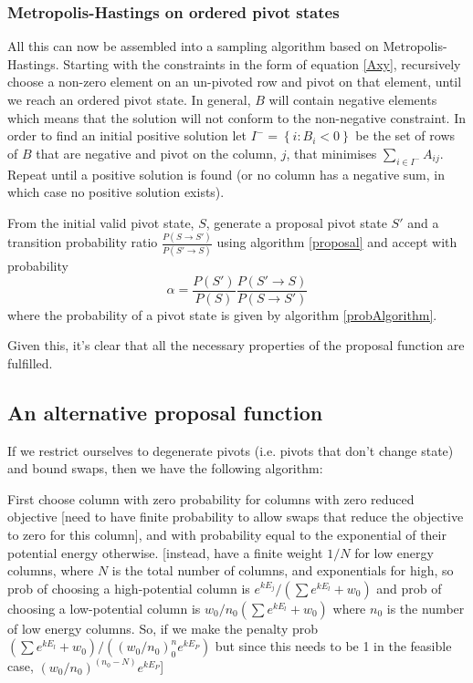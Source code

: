 \documentclass{article}
\begin{document}
\subsubsection{Metropolis-Hastings on ordered pivot states}

All this can now be assembled into a sampling algorithm based on Metropolis-Hastings. Starting with the constraints in the form of equation \ref{Axy}, recursively choose a non-zero element on an un-pivoted row and pivot on that element, until we reach an ordered pivot state. In general, $B$ will contain negative elements which means that the solution will not conform to the non-negative constraint. In order to find an initial positive solution let $I^- = \left\{i: B_i < 0\right\}$ be the set of rows of $B$ that are negative and pivot on the column, $j$, that minimises $\sum_{i\in I^-}A_{ij}$. Repeat until a positive solution is found (or no column has a negative sum, in which case no positive solution exists).

From the initial valid pivot state, $S$, generate a proposal pivot state $S'$ and a transition probability ratio $\frac{P(S\rightarrow S')}{P(S' \rightarrow S)}$ using algorithm \ref{proposal} and accept with probability
\[
\alpha = \frac{P(S')}{P(S)}\frac{P(S'\rightarrow S)}{P(S \rightarrow S')}
\]
where the probability of a pivot state is given by algorithm \ref{probAlgorithm}.

Given this, it's clear that all the necessary properties of the proposal function are fulfilled.

\subsection{An alternative proposal function}

If we restrict ourselves to degenerate pivots (i.e. pivots that don't change state) and bound swaps, then we have the following algorithm:

First choose column with zero probability for columns with zero reduced objective [need to have finite probability to allow swaps that reduce the objective to zero for this column], and with probability equal to the exponential of their potential energy otherwise. [instead, have a finite weight $1/N$ for low energy columns, where $N$ is the total number of columns, and exponentials for high, so prob of choosing a high-potential column is $e^{kE_j}/(\sum e^{kE_l} + w_0)$ and prob of choosing a low-potential column is $w_0/n_0(\sum e^{kE_l} + w_0)$ where $n_0$ is the number of low energy columns. So, if we make the penalty prob $(\sum e^{kE_l} + w_0)/((w_0/n_0)^n_0e^{kE_P})$ but since this needs to be 1 in the feasible case, $(w_0/n_0)^(n_0-N)e^{kE_P}$]
\end{document}
